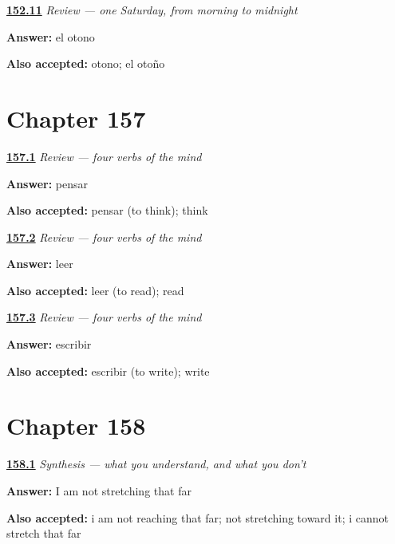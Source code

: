 \noindent\begin{minipage}[t]{\linewidth}
\raggedright
\hyperlink{review-ES-C40-repaso-un-sabado-de-octubre-estacion}{\textbf{152.11}} \emph{Review — one Saturday, from morning to midnight}\par
\small \textbf{Answer:} el otono\par
\footnotesize \textbf{Also accepted:} otono; el otoño
\end{minipage}\par\medskip

\section*{Chapter 157}

\noindent\begin{minipage}[t]{\linewidth}
\raggedright
\hyperlink{review-ES-C34-repaso-mente-weigh}{\textbf{157.1}} \emph{Review — four verbs of the mind}\par
\small \textbf{Answer:} pensar\par
\footnotesize \textbf{Also accepted:} pensar (to think); think
\end{minipage}\par\medskip

\noindent\begin{minipage}[t]{\linewidth}
\raggedright
\hyperlink{review-ES-C34-repaso-mente-gather}{\textbf{157.2}} \emph{Review — four verbs of the mind}\par
\small \textbf{Answer:} leer\par
\footnotesize \textbf{Also accepted:} leer (to read); read
\end{minipage}\par\medskip

\noindent\begin{minipage}[t]{\linewidth}
\raggedright
\hyperlink{review-ES-C34-repaso-mente-scratch}{\textbf{157.3}} \emph{Review — four verbs of the mind}\par
\small \textbf{Answer:} escribir\par
\footnotesize \textbf{Also accepted:} escribir (to write); write
\end{minipage}\par\medskip

\section*{Chapter 158}

\noindent\begin{minipage}[t]{\linewidth}
\raggedright
\hyperlink{review-ES-C34-sintesis-mente-literal}{\textbf{158.1}} \emph{Synthesis — what you understand, and what you don't}\par
\small \textbf{Answer:} I am not stretching that far\par
\footnotesize \textbf{Also accepted:} i am not reaching that far; not stretching toward it; i cannot stretch that far
\end{minipage}\par\medskip

